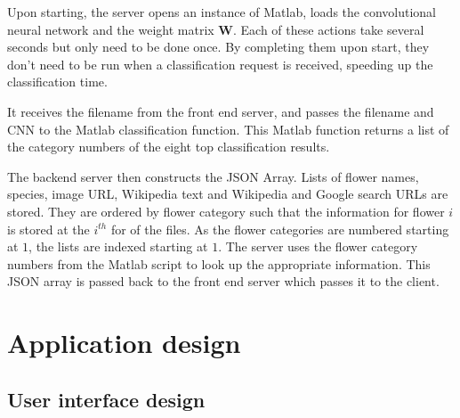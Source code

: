 \documentclass[11pt, a4paper]{report}
\newcommand{\vect}[1]{\boldsymbol{#1}}
\begin{document}
Upon starting, the server opens an instance of Matlab, loads the convolutional neural network and the weight matrix $\vect{W}$. Each of these actions take several seconds but only need to be done once. By completing them upon start, they don't need to be run when a classification request is received, speeding up the classification time. 

It receives the filename from the front end server, and passes the filename and CNN to the Matlab classification function. This Matlab function returns a list of the category numbers of the eight top classification results. 

The backend server then constructs the JSON Array. Lists of flower names, species, image URL, Wikipedia text and Wikipedia and Google search URLs are stored. They are ordered by flower category such that the information for flower $i$ is stored at the $i^{th}$ for of the files. As the flower categories are numbered starting at $1$, the lists are indexed starting at $1$. The server uses the flower category numbers from the Matlab script to look up the appropriate information. This JSON array is passed back to the front end server which passes it to the client. 




\chapter{Application design}



\section{User interface design}
\end{document}
